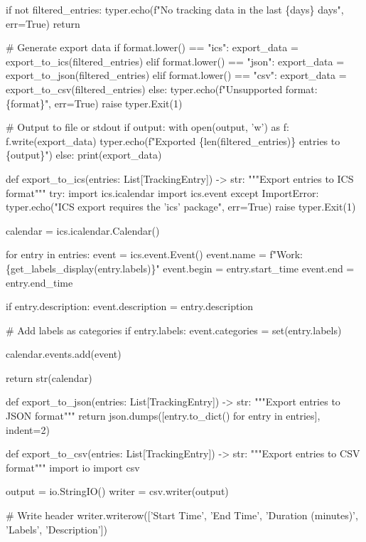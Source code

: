     if not filtered_entries:
        typer.echo(f"No tracking data in the last \{days\} days", err=True)
        return
    
    # Generate export data
    if format.lower() == "ics":
        export_data = export_to_ics(filtered_entries)
    elif format.lower() == "json":
        export_data = export_to_json(filtered_entries)
    elif format.lower() == "csv":
        export_data = export_to_csv(filtered_entries)
    else:
        typer.echo(f"Unsupported format: \{format\}", err=True)
        raise typer.Exit(1)
    
    # Output to file or stdout
    if output:
        with open(output, 'w') as f:
            f.write(export_data)
        typer.echo(f"Exported \{len(filtered_entries)\} entries to \{output\}")
    else:
        print(export_data)

def export_to_ics(entries: List[TrackingEntry]) -> str:
    """Export entries to ICS format"""
    try:
        import ics.icalendar
        import ics.event
    except ImportError:
        typer.echo("ICS export requires the 'ics' package", err=True)
        raise typer.Exit(1)
    
    calendar = ics.icalendar.Calendar()
    
    for entry in entries:
        event = ics.event.Event()
        event.name = f"Work: \{get_labels_display(entry.labels)\}"
        event.begin = entry.start_time
        event.end = entry.end_time
        
        if entry.description:
            event.description = entry.description
        
        # Add labels as categories
        if entry.labels:
            event.categories = set(entry.labels)
        
        calendar.events.add(event)
    
    return str(calendar)

def export_to_json(entries: List[TrackingEntry]) -> str:
    """Export entries to JSON format"""
    return json.dumps([entry.to_dict() for entry in entries], indent=2)

def export_to_csv(entries: List[TrackingEntry]) -> str:
    """Export entries to CSV format"""
    import io
    import csv
    
    output = io.StringIO()
    writer = csv.writer(output)
    
    # Write header
    writer.writerow(['Start Time', 'End Time', 'Duration (minutes)', 'Labels', 'Description'])
    
